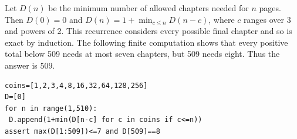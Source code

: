 Let $D(n)$ be the minimum number of allowed chapters needed for $n$ pages. Then $D(0)=0$ and $D(n)=1+\min_{c\le n}D(n-c)$, where $c$ ranges over 3 and powers of 2. This recurrence considers every possible final chapter and so is exact by induction. The following finite computation shows that every positive total below 509 needs at most seven chapters, but 509 needs eight. Thus the answer is $\boxed{509}$.
\begin{verbatim}
coins=[1,2,3,4,8,16,32,64,128,256]
D=[0]
for n in range(1,510):
 D.append(1+min(D[n-c] for c in coins if c<=n))
assert max(D[1:509])<=7 and D[509]==8
\end{verbatim}
